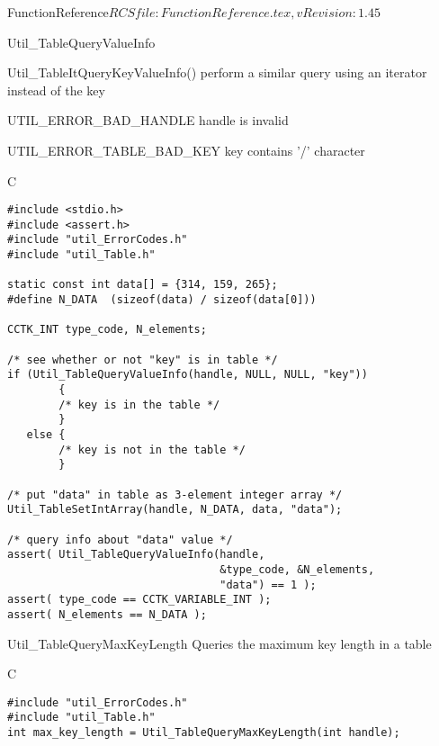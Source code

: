 \begin{cactuspart}{5}{FunctionReference}{$RCSfile: FunctionReference.tex,v $}{$Revision: 1.45 $}
\begin{FunctionDescription}{Util\_TableQueryValueInfo}
\begin{SeeAlso}{Util\_TableItQueryKeyValueInfo()}
perform a similar query using an iterator instead of the key
\end{SeeAlso}

\begin{Error}{UTIL\_ERROR\_BAD\_HANDLE}
handle is invalid
\end{Error}
\begin{Error}{UTIL\_ERROR\_TABLE\_BAD\_KEY}
key contains '/' character
\end{Error}

\begin{Example}{C}
\begin{verbatim}
#include <stdio.h>
#include <assert.h>
#include "util_ErrorCodes.h"
#include "util_Table.h"

static const int data[] = {314, 159, 265};
#define N_DATA  (sizeof(data) / sizeof(data[0]))

CCTK_INT type_code, N_elements;

/* see whether or not "key" is in table */
if (Util_TableQueryValueInfo(handle, NULL, NULL, "key"))
        {
        /* key is in the table */
        }
   else {
        /* key is not in the table */
        }

/* put "data" in table as 3-element integer array */
Util_TableSetIntArray(handle, N_DATA, data, "data");

/* query info about "data" value */
assert( Util_TableQueryValueInfo(handle,
                                 &type_code, &N_elements,
                                 "data") == 1 );
assert( type_code == CCTK_VARIABLE_INT );
assert( N_elements == N_DATA );
\end{verbatim}
\end{Example}
\end{FunctionDescription}


\begin{FunctionDescription}{Util\_TableQueryMaxKeyLength}
\label{Util-TableQueryMaxKeyLength}
Queries the maximum key length in a table

\begin{Synopsis}{C}
\begin{verbatim}
#include "util_ErrorCodes.h"
#include "util_Table.h"
int max_key_length = Util_TableQueryMaxKeyLength(int handle);
\end{verbatim}
\end{Synopsis}


\end{FunctionDescription}
\end{cactuspart}
